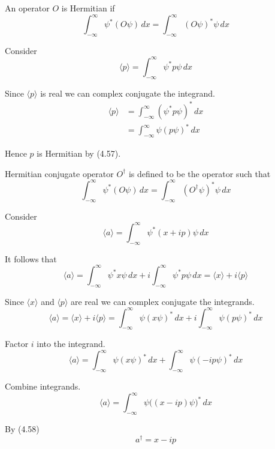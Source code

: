 


\bigskip
An operator $O$ is Hermitian if
\begin{equation*}
\int_{-\infty}^\infty\psi^*(O\psi)\,dx
=\int_{-\infty}^\infty(O\psi)^*\psi\,dx
\tag{4.57}
\end{equation*}

Consider
\begin{equation*}
\langle p\rangle=\int_{-\infty}^\infty\psi^*p\psi\,dx
\end{equation*}

Since $\langle p\rangle$ is real we can complex conjugate the integrand.
\begin{align*}
\langle p\rangle
&=\int_{-\infty}^\infty(\psi^*p\psi)^*\,dx
\\
&=\int_{-\infty}^\infty\psi(p\psi)^*\,dx
\end{align*}

Hence $p$ is Hermitian by (4.57).

\bigskip
Hermitian conjugate operator $O^\dag$ is defined to be the operator such that
\begin{equation*}
\int_{-\infty}^\infty\psi^*(O\psi)\,dx
=\int_{-\infty}^\infty(O^\dag\psi)^*\psi\,dx
\tag{4.58}
\end{equation*}

Consider
\begin{equation*}
\langle a\rangle=\int_{-\infty}^\infty\psi^*(x+ip)\psi\,dx
\end{equation*}

It follows that
\begin{equation*}
\langle a\rangle
=\int_{-\infty}^\infty\psi^*x\psi\,dx
+i\int_{-\infty}^\infty\psi^*p\psi\,dx
=\langle x\rangle+i\langle p\rangle
\end{equation*}

Since $\langle x\rangle$ and $\langle p\rangle$ are
real we can complex conjugate the integrands.
\begin{equation*}
\langle a\rangle=\langle x\rangle+i\langle p\rangle
=\int_{-\infty}^\infty\psi(x\psi)^*\,dx
+i\int_{-\infty}^\infty\psi(p\psi)^*\,dx
\end{equation*}

Factor $i$ into the integrand.
\begin{equation*}
\langle a\rangle
=\int_{-\infty}^\infty\psi(x\psi)^*\,dx
+\int_{-\infty}^\infty\psi(-ip\psi)^*\,dx
\end{equation*}

Combine integrands.
\begin{equation*}
\langle a\rangle
=\int_{-\infty}^\infty\psi\bigl((x-ip)\psi\bigr)^*\,dx
\end{equation*}

By (4.58)
\begin{equation*}
a^\dag=x-ip
\end{equation*}


